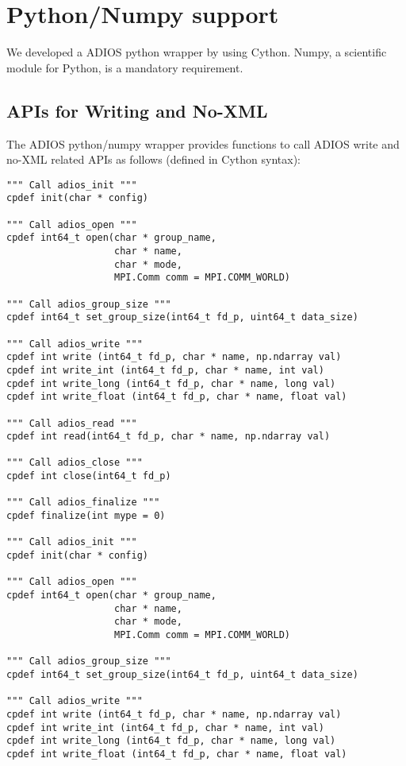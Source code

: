\section{Python/Numpy support}
\label{section-bindings-numpy}
We developed a ADIOS python wrapper by using Cython. Numpy, a scientific module for Python, is a mandatory requirement. 

\subsection{APIs for Writing and No-XML}
The ADIOS python/numpy wrapper provides functions to call ADIOS write and no-XML related APIs as follows (defined in Cython syntax):
\begin{lstlisting}[language=cython,frame=single, backgroundcolor=\color{gray85},caption={Functions for writing and No-XML},label={},]
""" Call adios_init """
cpdef init(char * config)

""" Call adios_open """
cpdef int64_t open(char * group_name,
                   char * name,
                   char * mode,
                   MPI.Comm comm = MPI.COMM_WORLD)

""" Call adios_group_size """
cpdef int64_t set_group_size(int64_t fd_p, uint64_t data_size)

""" Call adios_write """
cpdef int write (int64_t fd_p, char * name, np.ndarray val)
cpdef int write_int (int64_t fd_p, char * name, int val)
cpdef int write_long (int64_t fd_p, char * name, long val)
cpdef int write_float (int64_t fd_p, char * name, float val)

""" Call adios_read """
cpdef int read(int64_t fd_p, char * name, np.ndarray val)

""" Call adios_close """
cpdef int close(int64_t fd_p)

""" Call adios_finalize """
cpdef finalize(int mype = 0)

""" Call adios_init """
cpdef init(char * config)

""" Call adios_open """
cpdef int64_t open(char * group_name,
                   char * name,
                   char * mode,
                   MPI.Comm comm = MPI.COMM_WORLD)

""" Call adios_group_size """
cpdef int64_t set_group_size(int64_t fd_p, uint64_t data_size)

""" Call adios_write """
cpdef int write (int64_t fd_p, char * name, np.ndarray val)
cpdef int write_int (int64_t fd_p, char * name, int val)
cpdef int write_long (int64_t fd_p, char * name, long val)
cpdef int write_float (int64_t fd_p, char * name, float val)


\end{lstlisting}
